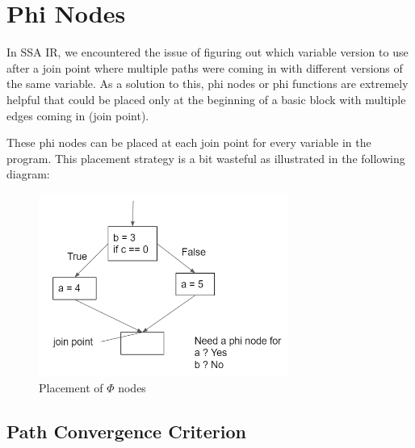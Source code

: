 \section{Phi Nodes}

In SSA IR, we encountered the issue of figuring out which variable version to use after a join point where multiple paths were coming in with different versions of the same variable. As a solution to this, phi nodes or phi functions are extremely helpful that could be placed only at the beginning of a basic block with multiple edges coming in (join point).

These phi nodes can be placed at each join point for every variable in the program. This placement strategy is a bit wasteful as illustrated in the following diagram:

\begin{figure}[htp]
\centering
\includegraphics[height=6cm]{images/phinodes.png}
\caption{Placement of \(\Phi\) nodes}
\end{figure}

\subsection{Path Convergence Criterion}

